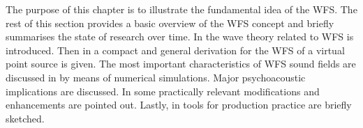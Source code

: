 The purpose of this chapter is to illustrate the fundamental idea of the WFS.
%
The rest of this section provides a basic overview of the WFS concept and
briefly summarises the state of research over time.
%
In  the wave theory related to WFS is introduced.
%
Then in  a compact and general derivation for the WFS
of a virtual point source is given.
%
The most important characteristics of WFS sound fields are discussed in
 by means of numerical simulations.
Major psychoacoustic implications are discussed.
%
In  some practically relevant modifications and
enhancements are pointed out.
%
Lastly, in  tools for production practice are briefly
sketched.




